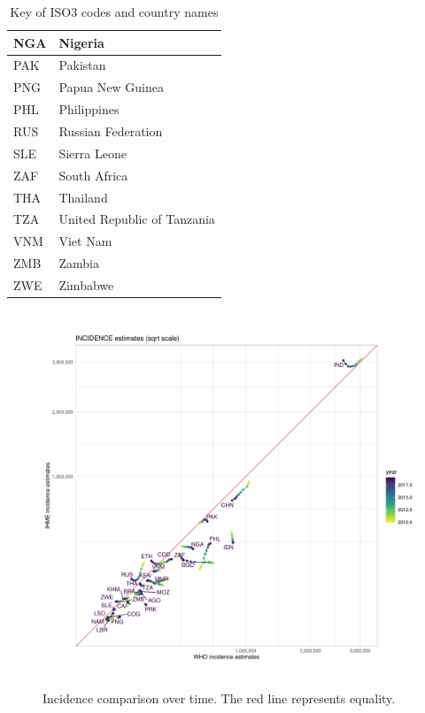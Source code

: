 \documentclass[12pt]{article}
\begin{document}
\begin{table}[]
\begin{tabular}{|l|l|}
NGA           & Nigeria                               \\ \hline
PAK           & Pakistan                              \\ \hline
PNG           & Papua New Guinea                      \\ \hline
PHL           & Philippines                           \\ \hline
RUS           & Russian Federation                    \\ \hline
SLE           & Sierra Leone                          \\ \hline
ZAF           & South Africa                          \\ \hline
THA           & Thailand                              \\ \hline
TZA           & United Republic of Tanzania           \\ \hline
VNM           & Viet Nam                              \\ \hline
ZMB           & Zambia                                \\ \hline
ZWE           & Zimbabwe                              \\ \hline
\end{tabular}
\caption{Key of ISO3 codes and country names}
\end{table}


\begin{figure}
  \centering
  \includegraphics[width=1\textwidth]{../plots/aF2a.pdf}
  \caption[Incidence comparison over time]{Incidence comparison over time. The
    red line represents equality.}
\end{figure}
\end{document}
